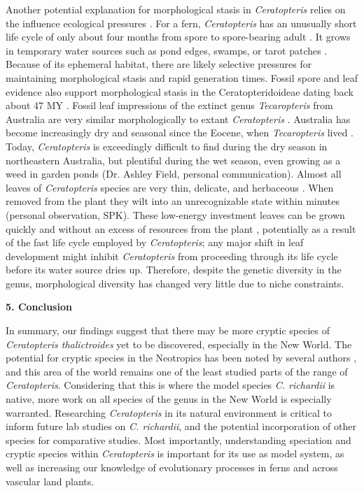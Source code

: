 \documentclass[12pt]{article}
\begin{document}
\begin{flushleft}
Another potential explanation for morphological stasis in \textit{Ceratopteris} relies on the influence ecological pressures \autocite{Bickford2007}. For a fern, \textit{Ceratopteris} has an unusually short life cycle of only about four months from spore to spore-bearing adult \autocite{Stein1971}. It grows in temporary water sources such as pond edges, swamps, or tarot patches \autocite{LloydTax1974}. Because of its ephemeral habitat, there are likely selective pressures for maintaining morphological stasis and rapid generation times. Fossil spore and leaf evidence also support morphological stasis in the Ceratopteridoideae dating back about 47 MY \autocite{Dettmann1992, Rozefelds2016-dr}. Fossil leaf impressions of the extinct genus \textit{Tecaropteris} from Australia are very similar morphologically to extant \textit{Ceratopteris} \autocite{Rozefelds2016-dr}. Australia has become increasingly dry and seasonal since the Eocene, when \textit{Tecaropteris} lived \autocite{Rozefelds2016-dr, McKenna2010}. Today, \textit{Ceratopteris} is exceedingly difficult to find during the dry season in northeastern Australia, but plentiful during the wet season, even growing as a weed in garden ponds (Dr. Ashley Field, personal communication). Almost all leaves of \textit{Ceratopteris} species are very thin, delicate, and herbaceous \autocite{LloydTax1974}. When removed from the plant they wilt into an unrecognizable state within minutes (personal observation, SPK). These low-energy investment leaves can be grown quickly and without an excess of resources from the plant \autocite{Reich2014, Wright2004}, potentially as a result of the fast life cycle employed by \textit{Ceratopteris}; any major shift in leaf development might inhibit \textit{Ceratopteris} from proceeding through its life cycle before its water source dries up. Therefore, despite the genetic diversity in the genus, morphological diversity has changed very little due to niche constraints. 

\vspace{1cm}

{\large\textbf{5. Conclusion}}

In summary, our findings suggest that there may be more cryptic species of \textit{Ceratopteris thalictroides} yet to be discovered, especially in the New World. The potential for cryptic species in the Neotropics has been noted by several authors \autocite{Masuyama2010, LloydTax1974}, and this area of the world remains one of the least studied parts of the range of \textit{Ceratopteris}. Considering that this is where the model species \textit{C. richardii} is native, more work on all species of the genus in the New World is especially warranted. Researching \textit{Ceratopteris} in its natural environment is critical to inform future lab studies on \textit{C. richardii}, and the potential incorporation of other species for comparative studies. Most importantly, understanding speciation and cryptic species within \textit{Ceratopteris} is important for its use as model system, as well as increasing our knowledge of evolutionary processes in ferns and across vascular land plants.


\end{flushleft}
\end{document}
